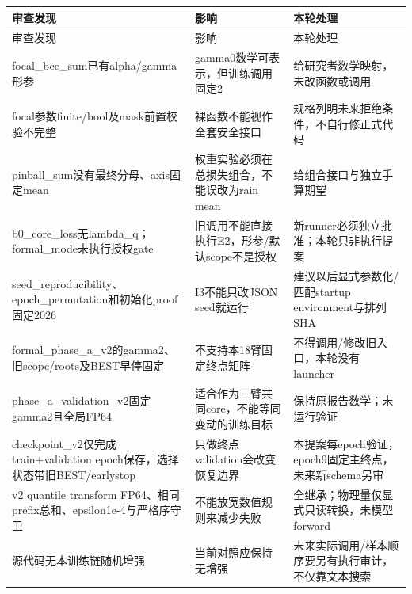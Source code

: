 \documentclass[UTF8,fontset=fandol,10pt]{ctexart}
\begin{document}
\begingroup\small\setlength{\tabcolsep}{3pt}\renewcommand{\arraystretch}{1.12}
\begin{longtable}{>{\raggedright\arraybackslash}p{\dimexpr(\linewidth-6\tabcolsep)/3\relax}>{\raggedright\arraybackslash}p{\dimexpr(\linewidth-6\tabcolsep)/3\relax}>{\raggedright\arraybackslash}p{\dimexpr(\linewidth-6\tabcolsep)/3\relax}}
\toprule
审查发现 & 影响 & 本轮处理 \\
\midrule\endfirsthead
审查发现 & 影响 & 本轮处理 \\
\midrule\endhead
focal\_\allowbreak{}bce\_\allowbreak{}sum已有alpha/\allowbreak{}gamma形参 & gamma0数学可表示，但训练调用固定2 & 给研究者数学映射，未改函数或调用 \\
focal参数finite/\allowbreak{}bool及mask前置校验不完整 & 裸函数不能视作全套安全接口 & 规格列明未来拒绝条件，不自行修正式代码 \\
pinball\_\allowbreak{}sum没有最终分母、axis固定mean & 权重实验必须在总损失组合，不能误改为rain mean & 给组合接口与独立手算期望 \\
b0\_\allowbreak{}core\_\allowbreak{}loss无lambda\_\allowbreak{}q；formal\_\allowbreak{}mode未执行授权gate & 旧调用不能直接执行E2，形参/\allowbreak{}默认scope不是授权 & 新runner必须独立批准；本轮只非执行提案 \\
seed\_\allowbreak{}reproducibility、epoch\_\allowbreak{}permutation和初始化proof固定2026 & I3不能只改JSON seed就运行 & 建议以后显式参数化/\allowbreak{}匹配startup environment与排列SHA \\
formal\_\allowbreak{}phase\_\allowbreak{}a\_\allowbreak{}v2的gamma2、旧scope/\allowbreak{}roots及BEST早停固定 & 不支持本18臂固定终点矩阵 & 不得调用/\allowbreak{}修改旧入口，本轮没有launcher \\
phase\_\allowbreak{}a\_\allowbreak{}validation\_\allowbreak{}v2固定gamma2且全局FP64 & 适合作为三臂共同core，不能等同变动的训练目标 & 保持原报告数学；未运行验证 \\
checkpoint\_\allowbreak{}v2仅完成train+validation epoch保存，选择状态带旧BEST/\allowbreak{}earlystop & 只做终点validation会改变恢复边界 & 本提案每epoch验证，epoch9固定主终点，未来新schema另审 \\
v2 quantile transform FP64、相同prefix总和、epsilon1e-4与严格序守卫 & 不能放宽数值规则来减少失败 & 全继承；物理量仅显式只读转换，未模型forward \\
源代码无本训练链随机增强 & 当前对照应保持无增强 & 未来实际调用/\allowbreak{}样本顺序要另有执行审计，不仅靠文本搜索 \\
\bottomrule\end{longtable}\endgroup
\end{document}
